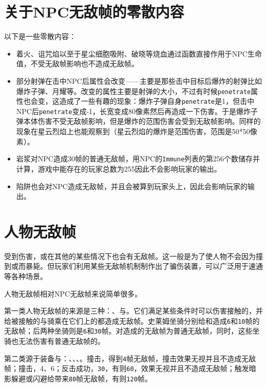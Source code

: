 \section{关于NPC无敌帧的零散内容}
以下是一些零散内容：
\begin{itemize}
\item 着火、诅咒焰以至于星尘细胞吸附、破晓等烧血通过函数直接作用于NPC生命值，不受无敌帧影响也不造成无敌帧。
\item 部分射弹在击中NPC后属性会改变——主要是那些击中目标后爆炸的射弹比如爆炸子弹、月耀等。改变的属性主要是射弹的大小，不过有时候\lstinline{penetrate}属性也会变，这造成了一些有趣的现象：爆炸子弹自身\lstinline{penetrate}是1，但击中NPC后\lstinline{penetrate}变成-1，长宽变成80像素然后再造成一下伤害。于是爆炸子弹本体伤害不受无敌帧影响，但是爆炸的范围伤害会受到无敌帧影响。同样的现象在星云烈焰上也能观察到（星云烈焰的爆炸是范围伤害，范围是50*50像素）。
\item 岩浆对NPC造成30帧的普通无敌帧，用NPC的\lstinline{Immune}列表的第256个数储存并计算，游戏中能存在的玩家总数为255因此不会影响玩家的输出。
\item 陷阱也会对NPC造成无敌帧，并且会被算到玩家头上，因此会影响玩家的输出。
\end{itemize}

\section{人物无敌帧}\label{sec29}
受到伤害，或在其他的某些情况下也会有无敌帧。这一般是为了使人物不会因为撞到或而暴毙。但玩家们利用某些无敌帧机制制作出了骗伤装置，可以广泛用于速通等各种场景。

人物无敌帧相对NPC无敌帧来说简单很多。

第一类人物无敌帧的来源是三种：、与。它们满足某些条件时可以伤害接触的，并给被接触的与骑乘在它们上的都造成无敌帧。史莱姆坐骑分别给和造成\lstinline{6}和\lstinline{10}帧的无敌帧；后两种坐骑则是\lstinline{6}和\lstinline{30}帧。对造成的无敌帧为普通无敌帧，同时，这些坐骑也无法伤害有普通无敌帧的。

第二类源于装备与：、、、。撞击，得到\lstinline{4}帧无敌帧，撞击效果无视并且不造成无敌帧；撞击，4、6；反击成功，\lstinline{30}，有则\lstinline{60}，效果无视并且不造成无敌帧；触发暗影躲避或闪避给带来\lstinline{80}帧无敌帧，有则\lstinline{120}帧。

